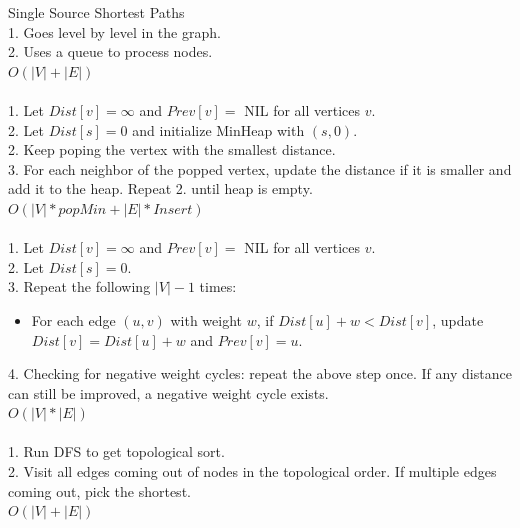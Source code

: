 \documentclass[10pt,a4paper]{article}
\begin{document}
\begin{multicols}{3}
\begin{textbox}{Single Source Shortest Paths}
      \\
    1. Goes level by level in the graph.\\
    2. Uses a queue to process nodes.\\ 
     $O(|V| + |E|)$ \\
    \linebreak
      \\ 
    1. Let $Dist[v] = \infty$ and $Prev[v] = $ NIL for all vertices $v$.\\
    2. Let $Dist[s] = 0$ and initialize MinHeap with $(s, 0)$.\\
    2. Keep poping the vertex with the smallest distance.\\
    3. For each neighbor of the popped vertex, update the distance if it is smaller and add it to the heap. Repeat 2. until heap is empty.\\ 
    \linebreak
     $O(|V|*popMin + |E|*Insert)$ \\
    \linebreak
     \\
    1. Let $Dist[v] = \infty$ and $Prev[v] = $ NIL for all vertices $v$.\\
    2. Let $Dist[s] = 0$.\\
    3. Repeat the following $|V|-1$ times:
    \begin{itemize}
    \item For each edge $(u, v)$ with weight $w$, if $Dist[u] + w < Dist[v]$, update $Dist[v] = Dist[u] + w$ and $Prev[v] = u$.
    \end{itemize}
    4. Checking for negative weight cycles: repeat the above step once. If any distance can still be improved, a negative weight cycle exists.\\
    \linebreak
     $O(|V|*|E|)$ \\
    \linebreak
      \\
    1. Run DFS to get topological sort.\\
    2. Visit all edges coming out of nodes in the topological order. If multiple edges coming out, pick the shortest. \\
     $O(|V| + |E|)$ \\
\end{textbox}


\end{multicols}
\end{document}

